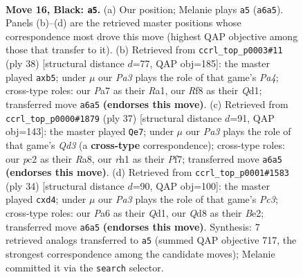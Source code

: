 \documentclass[11pt]{article}
\begin{document}
\begin{figure}[p]\centering
\begin{subfigure}{0.46\textwidth}\centering
\resizebox{\linewidth}{!}{%
\newchessgame
\chessboard[
  setfen={r2q1rk1/p3bp1p/p3p3/1P1pQ1p1/P2P2P1/2N4P/2P2P2/R3K2R b KQ - 1 16},
  showmover=false,
  pgfstyle=straightmove, color=movearrow, markmove={a6-a5}
]}
\caption{}
\end{subfigure}\hfill
\begin{subfigure}{0.46\textwidth}\centering
\resizebox{\linewidth}{!}{%
\newchessgame
\chessboard[
  setfen={4r1k1/1r2ppbp/6p1/pp1pPq2/P2B1P2/2P4P/1P3RP1/R2Q2K1 w - - 2 20},
  showmover=false,
  pgfstyle=straightmove, color=movearrow, markmove={a4-b5}
]}
\caption{}
\end{subfigure}
\\[4pt]
\begin{subfigure}{0.46\textwidth}\centering
\resizebox{\linewidth}{!}{%
\newchessgame
\chessboard[
  setfen={r2r2k1/pp3p1p/3qb1p1/3p4/P2Qp2P/1PP1P1P1/5PB1/RR4K1 b - - 0 19},
  showmover=false,
  pgfstyle=straightmove, color=movearrow, markmove={d6-e7}
]}
\caption{}
\end{subfigure}\hfill
\begin{subfigure}{0.46\textwidth}\centering
\resizebox{\linewidth}{!}{%
\newchessgame
\chessboard[
  setfen={r6r/pb2kpp1/1p2p2p/6q1/P2p4/2P1P1P1/4BP1P/R2Q1RK1 w - - 0 18},
  showmover=false,
  pgfstyle=straightmove, color=movearrow, markmove={c3-d4}
]}
\caption{}
\end{subfigure}
\caption{\textbf{Move 16, Black: \texttt{a5}.} (a) Our position; Melanie plays \texttt{a5} (\texttt{a6a5}). Panels (b)--(d) are the retrieved master positions whose correspondence most drove this move (highest QAP objective among those that transfer to it). (b) Retrieved from \texttt{ccrl\_top\_p0003\#11} (ply 38) [structural distance $d$=77, QAP obj=185]: the master played \texttt{axb5}; under $\mu$ our \emph{Pa3} plays the role of that game's \emph{Pa4}; cross-type roles: our \emph{P}a7 as their \emph{R}a1, our \emph{R}f8 as their \emph{Q}d1; transferred move \texttt{a6a5} \textbf{(endorses this move)}. (c) Retrieved from \texttt{ccrl\_top\_p0000\#1879} (ply 37) [structural distance $d$=91, QAP obj=143]: the master played \texttt{Qe7}; under $\mu$ our \emph{Pa3} plays the role of that game's \emph{Qd3} (a \textbf{cross-type} correspondence); cross-type roles: our \emph{p}c2 as their \emph{R}a8, our \emph{r}h1 as their \emph{P}f7; transferred move \texttt{a6a5} \textbf{(endorses this move)}. (d) Retrieved from \texttt{ccrl\_top\_p0001\#1583} (ply 34) [structural distance $d$=90, QAP obj=100]: the master played \texttt{cxd4}; under $\mu$ our \emph{Pa3} plays the role of that game's \emph{Pc3}; cross-type roles: our \emph{P}a6 as their \emph{Q}d1, our \emph{Q}d8 as their \emph{B}e2; transferred move \texttt{a6a5} \textbf{(endorses this move)}. Synthesis: 7 retrieved analogs transferred to \texttt{a5} (summed QAP objective 717, the strongest correspondence among the candidate moves); Melanie committed it via the \texttt{search} selector.}
\label{fig:thought-m31}
\end{figure}
\end{document}
